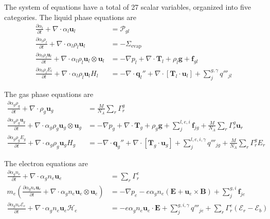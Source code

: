 The system of equations have a total of 27 scalar variables, organized into five categories. The liquid phase equations are
\begin{align}
    \frac{\partial \alpha_l}{\partial t} + \nabla \cdot \alpha_l \mathbf{u}_l &= \mathcal{P}_{gl} \\
    \frac{\partial \alpha_l \rho_l}{\partial t} + \nabla \cdot \alpha_l\rho_l \mathbf{u}_l &= -\Sigma_{\text{evap}} \\
    \frac{\partial \alpha_l \rho_l\mathbf{u}_l}{\partial t} + \nabla \cdot \alpha_l \rho_l \mathbf{u}_l \otimes \mathbf{u}_l &= -\nabla p_l + \nabla \cdot \mathbf{T}_l + \rho_l\mathbf{g} + \mathbf{f}_{gl} \\
    \frac{\partial \alpha_l \rho_l E_l}{\partial t} + \nabla \cdot \alpha_l \rho_l \mathbf{u}_l H_l &= -\nabla \cdot \mathbf{q}_l'' + \nabla \cdot \left[\mathbf{T}_l \cdot \mathbf{u}_l \right] + \sum_{j}^{g,\gamma} q'''_{jl} 
\end{align}

The gas phase equations are
\begin{align}
    \frac{\partial \alpha_g \rho_g}{\partial t} + \nabla \cdot \rho_g \mathbf{u}_g &= \frac{M}{N_A} \sum_{r} \Gamma_r^g \\
    \frac{\partial \alpha_g \rho_g \mathbf{u}_g}{\partial t} + \nabla \cdot \alpha_g \rho_g \mathbf{u}_g \otimes \mathbf{u}_g &= -\nabla p_g + \nabla \cdot \mathbf{T}_g + \rho_g\mathbf{g} + \sum_j^{l,e,i} \mathbf{f}_{jg} + \frac{M}{N_A} \sum_r \Gamma_r^g \mathbf{u}_r \\
    \frac{\partial \alpha_g \rho_g E_g}{\partial t} + \nabla \cdot \alpha_g \rho_g \mathbf{u}_g H_g &= -\nabla \cdot \mathbf{q}_g'' + \nabla \cdot \left[\mathbf{T}_g \cdot \mathbf{u}_g \right] + \sum_j^{l,e,i,\gamma} q'''_{jg} + \frac{M}{N_A} \sum_r \Gamma_r^g E_r
\end{align}

The electron equations are
\begin{align}
    \frac{\partial \alpha_g n_e}{\partial t} + \nabla \cdot \alpha_g n_e \mathbf{u}_e &= \sum_{r} \Gamma_r^e \\
    m_e \left(\frac{\partial \alpha_g n_e \mathbf{u}_e}{\partial t} + \nabla \cdot \alpha_g n_e \mathbf{u}_e \otimes \mathbf{u}_e \right) &= -\nabla p_e - e \alpha_g n_e (\mathbf{E} + \mathbf{u}_e \times \mathbf{B}) + \sum_j^{g,i} \mathbf{f}_{je} \\
    \frac{\partial \alpha_g n_e \mathcal{E}_e}{\partial t} + \nabla \cdot \alpha_g n_e \mathbf{u}_e \mathcal{H}_e &= -e \alpha_g n_e\mathbf{u}_e \cdot \mathbf{E} + \sum_j^{g,i,\gamma} q'''_{je} + \sum_{r} \Gamma_r^e (\mathcal{E}_r - \mathcal{E}_b)
\end{align}

